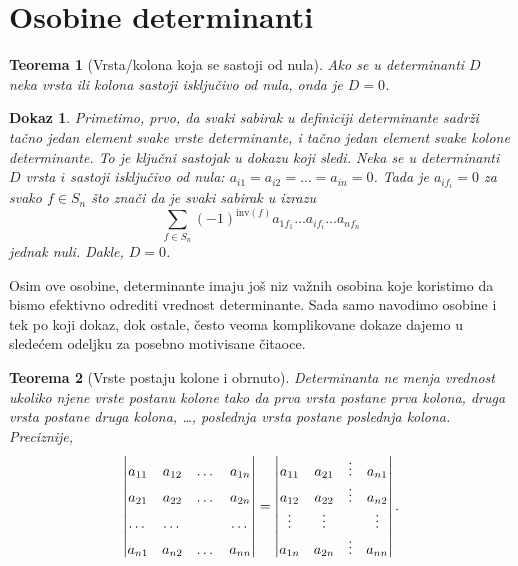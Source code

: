 \documentclass[11pt]{article}
\theoremstyle{masulthm}
\newtheorem{theorem}{Teorema}[section]
\theoremstyle{masuldef}
\theoremstyle{masulexmp}
\theoremstyle{masulproof}
\newtheorem*{masulproof}{Dokaz}
\newcommand{\inv}[1]{\text{inv}(#1)}
\begin{document}
\section{Osobine determinanti}

\begin{theorem}[Vrsta/kolona koja se sastoji od nula]
Ako se u determinanti $ D $ neka vrsta ili kolona sastoji isključivo od nula, onda je $ D = 0 $.
\end{theorem}

\noindent
\begin{masulproof}
    Primetimo, prvo, da svaki sabirak u definiciji determinante sadrži tačno jedan element svake
    vrste determinante, i tačno jedan element svake kolone determinante.
    To je ključni sastojak u dokazu koji sledi.
    Neka se u determinanti $ D $ vrsta $ i $ sastoji isključivo od nula:
    $ a_{i1} = a_{i2} = \dots = a_{in} = 0 $.
    Tada je $ a_{if_i} = 0 $ za svako $ f \in S_n $ što znači da je svaki sabirak u izrazu%
    \begin{equation*}
        \sum_{f \in S_n} (-1)^{\inv{f}} a_{1f_1} \dots a_{if_i} \dots a_{nf_n}
    \end{equation*}
    jednak nuli. Dakle, $ D = 0 $.
\end{masulproof}

Osim ove osobine, determinante imaju još niz važnih osobina koje koristimo da bismo
efektivno odrediti vrednost determinante. Sada samo navodimo osobine i tek po koji dokaz, dok ostale, često veoma komplikovane
dokaze dajemo u sledećem odeljku za posebno motivisane čitaoce.

\begin{theorem}[Vrste postaju kolone i obrnuto]

Determinanta ne menja vrednost ukoliko njene vrste postanu kolone tako da prva vrsta postane
prva kolona, druga vrsta postane druga kolona, \dots, poslednja vrsta postane poslednja kolona. Preciznije,
\newcommand{\D}{\vphantom{\vdots}}
\begin{align*}
    \begin{vmatrix}
        a_{11} & a_{12} & \dots & a_{1n} \D \\
        a_{21} & a_{22} & \dots & a_{2n} \D \\
        \dots  & \dots  &       & \dots  \D \\
        a_{n1} & a_{n2} & \dots & a_{nn} \D \\
    \end{vmatrix}
    =
    \begin{vmatrix}
        a_{11} & a_{21} & \vdots & a_{n1} \\
        a_{12} & a_{22} & \vdots & a_{n2} \\
        \vdots & \vdots &        & \vdots \\
        a_{1n} & a_{2n} & \vdots & a_{nn} \\
    \end{vmatrix}.
\end{align*}

\end{theorem}
\end{document}
